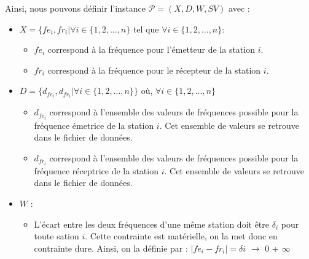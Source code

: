 \documentclass[a4paper, 10pt]{article}
\begin{document}
      Ainsi, nous pouvons définir l'instance $\mathcal{P} = (X, D, W, SV)$ avec :
      \begin{itemize}
        \item $X = \{ fe_i, fr_i | \forall i \in \{1,2,...,n\}$ tel que $\forall i \in \{1,2,...,n\}$:
              \begin{itemize}
                \item $fe_{i}$ correspond à la fréquence pour l'émetteur de la station $i$.
                \item $fr_{i}$ correspond à la fréquence pour le récepteur de la station $i$.
              \end{itemize}
        \item $D = \{d_{fe_i}, d_{fr_i} | \forall i \in \{1,2,...,n\} \}$ où, $\forall i \in \{1,2,...,n\}$
              \begin{itemize}
                \item $d_{fe_i}$ correspond à l'ensemble des valeurs de fréquences possible pour la fréquence émetrice de la station $i$. Cet ensemble de valeurs se retrouve dans le fichier de données.
                \item $d_{fr_i}$ correspond à l'ensemble des valeurs de fréquences possible pour la fréquence réceptrice de la station $i$. Cet ensemble de valeurs se retrouve dans le fichier de données.
              \end{itemize}
        \item $W$ :
              \begin{itemize}
                \item L'écart entre les deux fréquences d'une même station doit être $\delta_{i}$ pour toute sation $i$. Cette contrainte est matérielle, on la met donc en contrainte dure. Ainsi, on la définie par :
                 $| fe_{i} - fr_{i} | = \delta{i}$ $\rightarrow$ \color{green} 0 \color{red} + $\infty$ \color{black}


\end{itemize}
\end{itemize}
\end{document}
